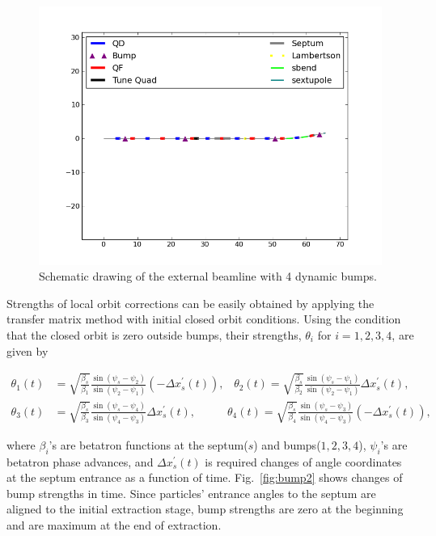 \documentclass[aps,prstab,onecolumn,preprint,nofootinbib]{revtex4-1}
\begin{document}
\begin{figure}[tbh!]
  \begin{center}
    \includegraphics[width=.45\textwidth]{img/20140109-00.png}
    \caption{\label{fig:bump1}Schematic drawing of the external beamline with 4 dynamic bumps.}
  \end{center}
\end{figure}

Strengths of local orbit corrections can be easily obtained by applying the transfer matrix method with initial closed orbit conditions.
Using the condition that the closed orbit is zero outside bumps, their strengths, $\theta_{i}$ for $i=1,2,3,4$, are given by
\begin{widetext}
\begin{equation}
  \begin{split}
  \theta_{1}(t) & = \sqrt{\frac{\beta_{s}}{\beta_{1}}}
               \frac{\sin(\psi_{s} - \psi_{2})}
                    {\sin(\psi_{2} - \psi_{1})}
               \left( - \Delta x_{s}^{\prime} (t) \right),
  \;\;\;
  \theta_{2}(t) = \sqrt{\frac{\beta_{s}}{\beta_{2}}}
               \frac{\sin(\psi_{s} - \psi_{1})}
                    {\sin(\psi_{2} - \psi_{1})}
               \Delta x_{s}^{\prime} (t), \\
  \theta_{3}(t) & = \sqrt{\frac{\beta_{s}}{\beta_{3}}}
               \frac{\sin(\psi_{s} - \psi_{4})}
                    {\sin(\psi_{4} - \psi_{3})}
               \Delta x_{s}^{\prime} (t),
  \;\;\;\;\;\;\;\;\;\;
  \theta_{4}(t) = \sqrt{\frac{\beta_{s}}{\beta_{4}}}
               \frac{\sin(\psi_{s} - \psi_{3})}
                    {\sin(\psi_{4} - \psi_{3})}
               \left( - \Delta x_{s}^{\prime} (t) \right),
  \end{split}
\end{equation}
\end{widetext}
where $\beta_{i}$'s are betatron functions at the septum($s$) and bumps($1,2,3,4$), $\psi_{i}$'s are betatron phase advances, and $\Delta x^{\prime}_{s} (t)$ is required changes of angle coordinates at the septum entrance as a function of time.
Fig.~\ref{fig:bump2} shows changes of bump strengths in time.
Since particles' entrance angles to the septum are aligned to the initial extraction stage, bump strengths are zero at the beginning and are maximum at the end of extraction.
\end{document}

